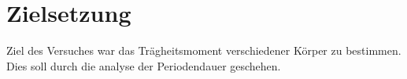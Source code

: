 \section{Zielsetzung}
\label{sec:Zielsetzung}

Ziel des Versuches war das Trägheitsmoment verschiedener Körper zu bestimmen.
Dies soll durch die analyse der Periodendauer geschehen.
